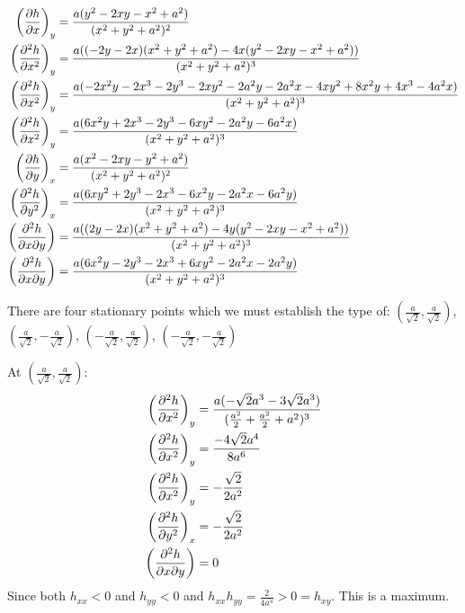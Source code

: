 \documentclass[10pt,\jkfside,a4paper]{article}
\begin{document}
\begin{enumerate}
\begin{equation}
\begin{split}
\left(\pdv{h}{x}\right)_y &= \frac{a(y^{2} - 2xy - x^{2} + a^2)}{(x^{2} + y^{2} + a^2)^2} \\
\left(\pdv[2]{h}{x}\right)_y &= \frac{a((-2y - 2x)(x^{2} + y^{2} + a^2) - 4x(y^{2} - 2xy - x^{2} + a^2))}{(x^{2} + y^{2} + a^2)^3} \\
\left(\pdv[2]{h}{x}\right)_y &= \frac{a(-2x^{2}y - 2x^3 - 2y^3 - 2xy^{2} - 2a^2y - 2a^2x - 4xy^{2} + 8x^{2}y + 4x^3 - 4a^2x)}{(x^{2} + y^{2} + a^2)^3} \\
\left(\pdv[2]{h}{x}\right)_y &= \frac{a(6x^{2}y + 2x^3 - 2y^3 - 6xy^{2} - 2a^2y - 6a^2x)}{(x^{2} + y^{2} + a^2)^3} \\
\left(\pdv{h}{y}\right)_x &= \frac{a(x^{2} - 2xy - y^{2} + a^2)}{(x^{2} + y^{2} + a^2)^2} \\
\left(\pdv[2]{h}{y}\right)_x &= \frac{a(6xy^{2} + 2y^3 - 2x^3 - 6x^{2}y - 2a^2x - 6a^2y)}{(x^{2} + y^{2} + a^2)^3} \\
\left(\pdv[2]{h}{x}{y}\right) &= \frac{a((2y - 2x)(x^{2} + y^{2} + a^2) - 4y(y^{2} - 2xy - x^{2} + a^2))}{(x^{2} + y^{2} + a^2)^3} \\
\left(\pdv[2]{h}{x}{y}\right) &= \frac{a(6x^{2}y - 2y^3 - 2x^3 + 6xy^{2} - 2a^2x - 2a^2y)}{(x^{2} + y^{2} + a^2)^3} \\
\end{split}
\end{equation}

There are four stationary points which we must establish the type of: 
$(\frac{a}{\sqrt{2}}, \frac{a}{\sqrt{2}})$, $(\frac{a}{\sqrt{2}}, -\frac{a}{\sqrt{2}})$, $(-\frac{a}{\sqrt{2}}, \frac{a}{\sqrt{2}})$, 
$(-\frac{a}{\sqrt{2}}, -\frac{a}{\sqrt{2}})$

At $(\frac{a}{\sqrt{2}}, \frac{a}{\sqrt{2}})$:
\begin{equation}
\begin{split}
\left(\pdv[2]{h}{x}\right)_y &= \frac{a(- \sqrt{2}a^3 - 3\sqrt{2}a^3)}{(\frac{a^2}{2} + \frac{a^2}{2} + a^2)^3} \\
\left(\pdv[2]{h}{x}\right)_y &= \frac{- 4\sqrt{2}a^4}{8a^6} \\
\left(\pdv[2]{h}{x}\right)_y &= -\frac{\sqrt{2}}{2a^2} \\
\left(\pdv[2]{h}{y}\right)_x &= -\frac{\sqrt{2}}{2a^2} \\
\left(\pdv[2]{h}{x}{y}\right) &= 0 \\
\end{split}
\end{equation}
Since both $h_{xx} < 0$ and $h_{yy} < 0$ and $h_{xx}h_{yy} = \frac{2}{4a^4} > 0 = h_{xy}$. This is a maximum.


\end{enumerate}
\end{document}
